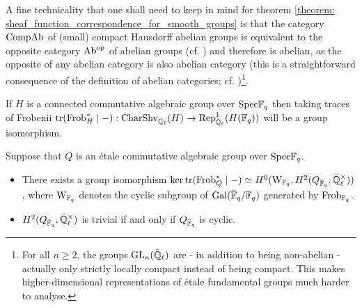             \begin{remark} \label{remark: the_category_of_compact_hausdorff_abelian_groups}
                A fine technicality that one shall need to keep in mind for theorem \ref{theorem: sheaf_function_correspondence_for_smooth_groups} is that the category $\mathrm{Comp}\mathrm{Ab}$ of (small) compact Hausdorff abelian groups is equivalent to the opposite category $\mathrm{Ab}^{\mathrm{op}}$ of abelian groups (cf. \cite[Proposition IV.5.2]{maclane}) and therefore is abelian, as the opposite of any abelian category is also abelian category (this is a straightforward consequence of the definition of abelian categories; cf. \cite[Section VIII.3]{maclane})\footnote{For all $n \geq 2$, the groups $\operatorname{GL}_n(\bar{\mathbb{Q}}_{\ell})$ are - in addition to being non-abelian - actually only strictly locally compact instead of being compact. This makes higher-dimensional representations of \'etale fundamental groups much harder to analyse.}.
            \end{remark}
            \begin{lemma} \label{lemma: sheaf_function_correspondence_for_connected_algebraic_groups}
                \cite[Proposition 1.14]{cunningham_roe_function_sheaf_dictionary_quasi_characters_p_adic_tori} If $H$ is a connected commutative algebraic group over $\mathrm{Spec} \mathbb{F}_q$ then taking traces of Frobenii $\operatorname{tr}(\mathrm{Frob}_H^* \mid -): \mathrm{Char}\mathrm{Shv}_{\bar{\mathbb{Q}}_{\ell}}(H) \to \mathrm{Rep}_{\bar{\mathbb{Q}}_{\ell}}^1(H(\mathbb{F}_q))$ will be a group isomorphism.
            \end{lemma}
            \begin{lemma} \label{lemma: sheaf_function_correspondence_for_etale_commutative_group_schemes}
                Suppose that $Q$ is an \'etale commutative algebraic group over $\mathrm{Spec} \mathbb{F}_q$.
                \begin{itemize}
                    \item \cite[Proposition 2.7]{cunningham_roe_function_sheaf_dictionary_quasi_characters_p_adic_tori} There exists a group isomorphism $\ker \trace(\Frob_Q^* \mid -) \cong H^0(\rmW_{\F_q}, H^2(Q_{\bar{\F}_q}, \bar{\Q}_{\ell}^{\x}))$, where $\mathrm{W}_{\mathbb{F}_q}$ denotes the cyclic subgroup of $\mathrm{Gal}(\bar{\mathbb{F}}_q/\mathbb{F}_q)$ generated by $\mathrm{Frob}_{\mathbb{F}_q}$. 
                    \item \cite[Remark 2.9]{cunningham_roe_function_sheaf_dictionary_quasi_characters_p_adic_tori} $H^2(Q_{\bar{\F}_q}, \bar{\Q}_{\ell}^{\x})$ is trivial if and only if $Q_{\bar{\mathbb{F}}_q}$ is cyclic.
                \end{itemize}
            \end{lemma}

